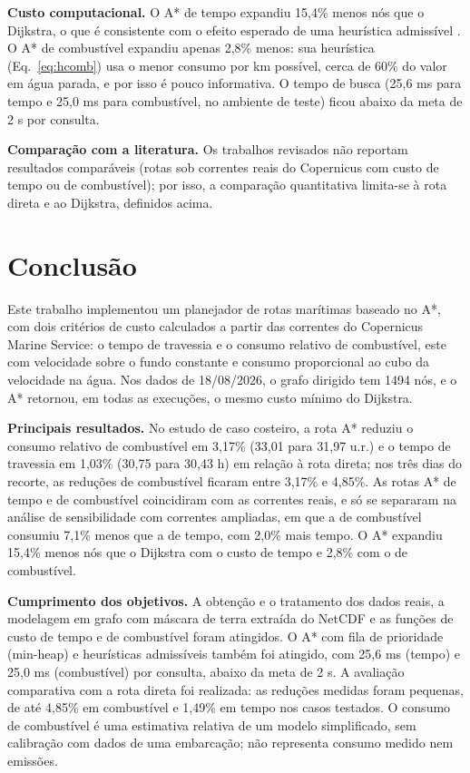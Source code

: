 \documentclass[conference]{IEEEtran}
\begin{document}
\textbf{Custo computacional.} O A* de tempo expandiu 15,4\% menos nós que o Dijkstra, o que é consistente com o efeito esperado de uma heurística admissível \cite{hart}. O A* de combustível expandiu apenas 2,8\% menos: sua heurística (Eq.~\ref{eq:hcomb}) usa o menor consumo por km possível, cerca de 60\% do valor em água parada, e por isso é pouco informativa. O tempo de busca (25,6 ms para tempo e 25,0 ms para combustível, no ambiente de teste) ficou abaixo da meta de 2 s por consulta.

\textbf{Comparação com a literatura.} Os trabalhos revisados \cite{hart,lavalle,pardede,stramma,psaraftis} não reportam resultados comparáveis (rotas sob correntes reais do Copernicus com custo de tempo ou de combustível); por isso, a comparação quantitativa limita-se à rota direta e ao Dijkstra, definidos acima.

\section{Conclusão}
Este trabalho implementou um planejador de rotas marítimas baseado no A*, com dois critérios de custo calculados a partir das correntes do Copernicus Marine Service: o tempo de travessia e o consumo relativo de combustível, este com velocidade sobre o fundo constante e consumo proporcional ao cubo da velocidade na água. Nos dados de 18/08/2026, o grafo dirigido tem 1494 nós, e o A* retornou, em todas as execuções, o mesmo custo mínimo do Dijkstra.

\textbf{Principais resultados.} No estudo de caso costeiro, a rota A* reduziu o consumo relativo de combustível em 3,17\% (33,01 para 31,97 u.r.) e o tempo de travessia em 1,03\% (30,75 para 30,43 h) em relação à rota direta; nos três dias do recorte, as reduções de combustível ficaram entre 3,17\% e 4,85\%. As rotas A* de tempo e de combustível coincidiram com as correntes reais, e só se separaram na análise de sensibilidade com correntes ampliadas, em que a de combustível consumiu 7,1\% menos que a de tempo, com 2,0\% mais tempo. O A* expandiu 15,4\% menos nós que o Dijkstra com o custo de tempo e 2,8\% com o de combustível.

\textbf{Cumprimento dos objetivos.} A obtenção e o tratamento dos dados reais, a modelagem em grafo com máscara de terra extraída do NetCDF e as funções de custo de tempo e de combustível foram atingidos. O A* com fila de prioridade (min-heap) e heurísticas admissíveis também foi atingido, com 25,6 ms (tempo) e 25,0 ms (combustível) por consulta, abaixo da meta de 2 s. A avaliação comparativa com a rota direta foi realizada: as reduções medidas foram pequenas, de até 4,85\% em combustível e 1,49\% em tempo nos casos testados. O consumo de combustível é uma estimativa relativa de um modelo simplificado, sem calibração com dados de uma embarcação; não representa consumo medido nem emissões.
\end{document}
